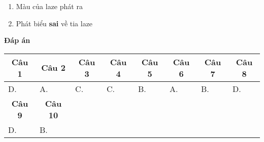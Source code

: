\begin{enumerate}
	\item Màu của laze phát ra
	
	\item Phát biểu \textbf{sai} về tia laze
	
\end{enumerate}
\begin{center}
	\textbf{Đáp án}
	
\end{center}

\begin{longtable}[\textwidth]{|p{}|p{}|p{}|p{}|p{}|p{}|p{}|p{}|}
	\hline%
	\multicolumn{1}{|c}{\textbf{Câu 1}} & \multicolumn{1}{|c|}{\textbf{Câu 2}} & \multicolumn{1}{c|}{\textbf{Câu 3}} &
	\multicolumn{1}{c|}{\textbf{Câu 4}} &
	\multicolumn{1}{c|}{\textbf{Câu 5}} &
	\multicolumn{1}{c|}{\textbf{Câu 6}} &
	\multicolumn{1}{c|}{\textbf{Câu 7}} &
	\multicolumn{1}{c|}{\textbf{Câu 8}}\\
	\hline
	D. &A. &C. &C. &B. &A. &B. &D.\\
	\hline
	
	\multicolumn{1}{|c|}{\textbf{Câu 9}} & \multicolumn{1}{c|}{\textbf{Câu 10}} & \multicolumn{1}{c|}{\textbf{}} &
	\multicolumn{1}{c|}{\textbf{}} &
	\multicolumn{1}{c|}{\textbf{}} &
	\multicolumn{1}{c|}{\textbf{}} &
	\multicolumn{1}{c|}{\textbf{}} &
	\multicolumn{1}{c|}{} \\
	\hline
	D. &B. & & & & & &\\
	\hline		
\end{longtable}









